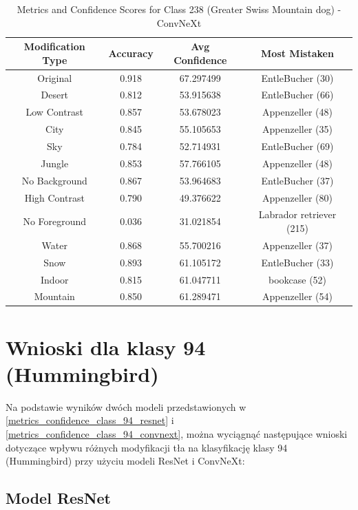 \begin{table}
	\centering
	\begin{tabular}{|c|c|c|c|}
		\hline
		\textbf{Modification Type} & \textbf{Accuracy} & \textbf{Avg Confidence} & \textbf{Most Mistaken} \\
		\hline
		Original & 0.918 & 67.297499 & EntleBucher (30) \\
		\hline
		Desert & 0.812 & 53.915638 & EntleBucher (66) \\
		\hline
		Low Contrast & 0.857 & 53.678023 & Appenzeller (48) \\
		\hline
		City & 0.845 & 55.105653 & Appenzeller (35) \\
		\hline
		Sky & 0.784 & 52.714931 & EntleBucher (69) \\
		\hline
		Jungle & 0.853 & 57.766105 & Appenzeller (48) \\
		\hline
		No Background & 0.867 & 53.964683 & EntleBucher (37) \\
		\hline
		High Contrast & 0.790 & 49.376622 & Appenzeller (80) \\
		\hline
		No Foreground & 0.036 & 31.021854 & Labrador retriever (215) \\
		\hline
		Water & 0.868 & 55.700216 & Appenzeller (37) \\
		\hline
		Snow & 0.893 & 61.105172 & EntleBucher (33) \\
		\hline
		Indoor & 0.815 & 61.047711 & bookcase (52) \\
		\hline
		Mountain & 0.850 & 61.289471 & Appenzeller (54) \\
		\hline
	\end{tabular}
	\caption{Metrics and Confidence Scores for Class 238 (Greater Swiss Mountain dog) - ConvNeXt}
	\label{tab:metrics_confidence_class_238_convnext}
\end{table}

\section*{Wnioski dla klasy 94 (Hummingbird)}

Na podstawie wyników dwóch modeli przedstawionych w \ref*{metrics_confidence_class_94_resnet} i \ref*{metrics_confidence_class_94_convnext}, można wyciągnąć następujące wnioski dotyczące wpływu różnych 
modyfikacji tła na klasyfikację klasy 94 (Hummingbird) przy użyciu modeli ResNet i ConvNeXt:

\subsection*{Model ResNet}

